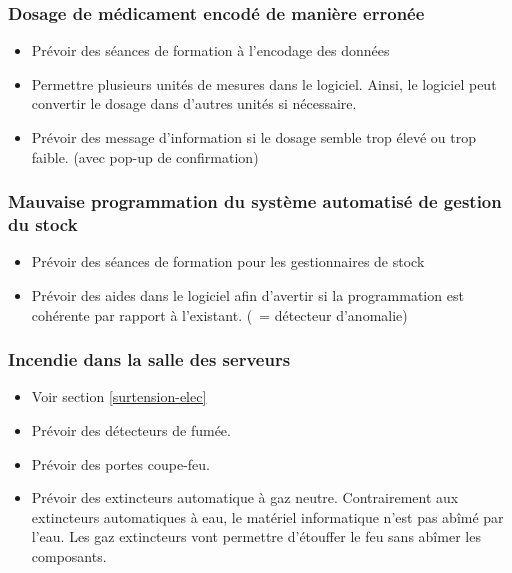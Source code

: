 \documentclass[12pt]{article}
\begin{document}
\subsubsection{Dosage de médicament encodé de manière erronée}
\justify
\begin{itemize}
	\item Prévoir des séances de formation à l'encodage des données
	\item Permettre plusieurs unités de mesures dans le logiciel. Ainsi, le logiciel peut convertir le dosage dans d'autres unités si nécessaire.
	\item Prévoir des message d'information si le dosage semble trop élevé ou trop faible. (avec pop-up de confirmation)
\end{itemize}

\subsubsection{Mauvaise programmation du système automatisé de gestion du stock}
\justify
\begin{itemize}
	\item Prévoir des séances de formation pour les gestionnaires de stock
	\item Prévoir des aides dans le logiciel afin d'avertir si la programmation est cohérente par rapport à l'existant. (~= détecteur d'anomalie)
\end{itemize}

\subsubsection{Incendie dans la salle des serveurs}
\justify
\begin{itemize}
	\item Voir section \ref{surtension-elec}
	\item Prévoir des détecteurs de fumée.
	\item Prévoir des portes coupe-feu.
	\item Prévoir des extincteurs automatique à gaz neutre. Contrairement aux extincteurs automatiques à eau, le matériel informatique n'est pas abîmé par l'eau. Les gaz extincteurs vont permettre d'étouffer le feu sans abîmer les composants.
\end{itemize}
\end{document}
